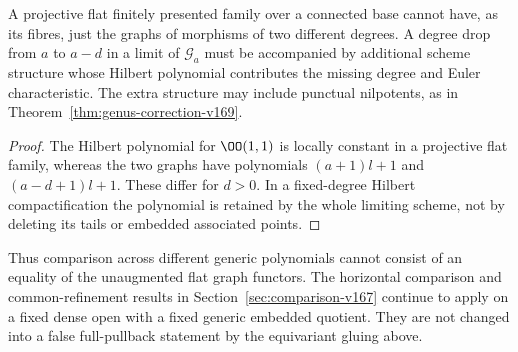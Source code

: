 \begin{proposition}
\label{prop:conservation-v169}
A projective flat finitely presented family over a connected base
cannot have, as its fibres, just the graphs of morphisms of two
different degrees. A degree drop from $a$ to $a-d$ in a limit of
$\mathcal G_a$ must be accompanied by additional scheme structure
whose Hilbert polynomial contributes the missing degree and Euler
characteristic. The extra structure may include punctual nilpotents,
as in Theorem~\ref{thm:genus-correction-v169}.
\end{proposition}
\begin{proof}
The Hilbert polynomial for $\OO(1,1)$ is locally constant in a
projective flat family, whereas the two graphs have polynomials
$(a+1)l+1$ and $(a-d+1)l+1$. These differ for $d>0$. In a fixed-degree
Hilbert compactification the polynomial is retained by the whole
limiting scheme, not by deleting its tails or embedded associated
points.
\end{proof}
Thus comparison across different generic polynomials cannot consist
of an equality of the unaugmented flat graph functors. The horizontal
comparison and common-refinement results in
Section~\ref{sec:comparison-v167} continue to apply on a fixed dense
open with a fixed generic embedded quotient. They are not changed into
a false full-pullback statement by the equivariant gluing above.

